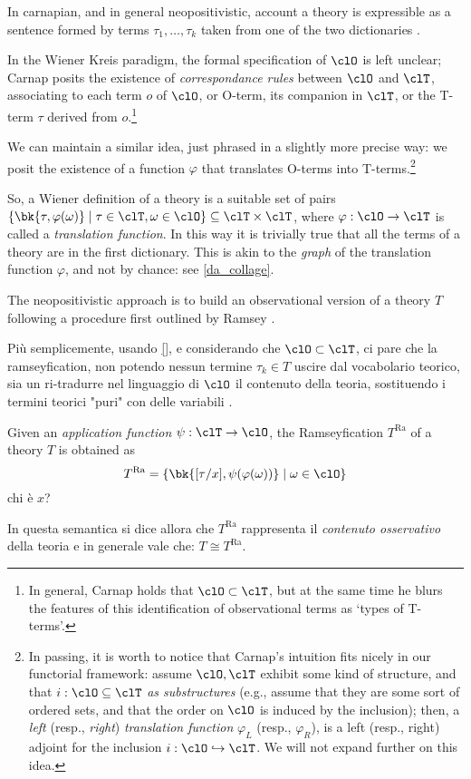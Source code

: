 In carnapian, and in general neopositivistic, account a theory is expressible as a sentence formed by terms $\tau_1, \dots, \tau_k$ taken from one of the two dictionaries \cite{?}. 

In the Wiener Kreis paradigm, the formal specification of $\clO$ is left unclear; Carnap \cite{} posits the existence of \emph{correspondance rules} between $\clO$ and $\clT$, associating to each term $o$ of $\clO$, or O-term, its companion in $\clT$, or the T-term $\tau$ derived from $o$.\footnote{In general, Carnap holds that $\clO \subset \clT$, but at the same time he blurs the features of this identification of observational terms as `types of T-terms'.}

We can maintain a similar idea, just phrased in a slightly more precise way: we posit the existence of a function $\varphi$ that translates O-terms into T-terms.\footnote{In passing, it is worth to notice that Carnap's intuition fits nicely in our functorial framework: assume $\clO,\clT$ exhibit some kind of structure, and that $i : \clO\subseteq\clT$ \emph{as substructures} (e.g., assume that they are some sort of ordered sets, and that the order on $\clO$ is induced by the inclusion); then, a \emph{left} (resp., \emph{right}) \emph{translation function} $\varphi_L$ (resp., $\varphi_R$), is a left (resp., right) adjoint for the inclusion $i : \clO\hookrightarrow \clT$. We will not expand further on this idea.}

So, a Wiener definition of a theory is a suitable set of pairs $\{\bk{\tau,\varphi(\omega)} \mid \tau\in\clT, \omega \in\clO\}\subseteq \clT\times\clT$, where $\varphi: \clO \to \clT$ is called a \emph{translation function}. In this way it is trivially true that all the terms of a theory are in the first dictionary. This is akin to the \emph{graph} of the translation function $\varphi$, and not by chance: see \autoref{da_collage}.

The neopositivistic approach is to build an observational version of a theory $T$ following a procedure first outlined by Ramsey \cite{?}.

Più semplicemente, usando \autoref{}, e considerando che $\clO \subset \clT$, ci pare che la ramseyfication, non potendo nessun termine $\tau_k \in T$ uscire dal vocabolario teorico, sia un ri-tradurre nel linguaggio di $\clO$ il contenuto della teoria, sostituendo i termini teorici "puri" con delle variabili \cite{?}.
\begin{definition}
	Given an \emph{application function} $\psi: \clT \to \clO$, the Ramseyfication $T^\text{Ra}$ of a theory $T$ is obtained as  
	\[ 
		T^\text{Ra} = \{\bk{[\tau/x], \psi(\varphi (\omega))} \mid \omega\in\clO\} 
	\] {\color{red} chi è $x$?}
\end{definition}
In questa semantica si dice allora che $T^\text{Ra}$ rappresenta il \emph{contenuto osservativo} della teoria e in generale vale che: $T \cong T^\text{Ra}$. 



